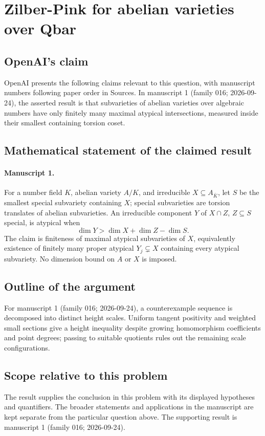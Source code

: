 \documentclass[11pt]{article}
\begin{document}
\section*{Zilber-Pink for abelian varieties over Qbar}

\subsection{OpenAI's claim}
OpenAI presents the following claims relevant to this question, with manuscript numbers following paper order in Sources. In manuscript 1 (family 016; 2026-09-24), the asserted result is that subvarieties of abelian varieties over algebraic numbers have only finitely many maximal atypical intersections, measured inside their smallest containing torsion coset.

\subsection{Mathematical statement of the claimed result}
\paragraph{Manuscript 1.}
For a number field $K$, abelian variety $A/K$, and irreducible $X\subseteq A_{\bar K}$, let $S$ be the smallest special subvariety containing $X$; special subvarieties are torsion translates of abelian subvarieties. An irreducible component $Y$ of $X\cap Z$, $Z\subseteq S$ special, is atypical when
\[
 \dim Y>\dim X+\dim Z-\dim S.
\]
The claim is finiteness of maximal atypical subvarieties of $X$, equivalently existence of finitely many proper atypical $Y_j\subsetneq X$ containing every atypical subvariety. No dimension bound on $A$ or $X$ is imposed.

\subsection{Outline of the argument}
For manuscript 1 (family 016; 2026-09-24), a counterexample sequence is decomposed into distinct height scales. Uniform tangent positivity and weighted small sections give a height inequality despite growing homomorphism coefficients and point degrees; passing to suitable quotients rules out the remaining scale configurations.

\subsection{Scope relative to this problem}
The result supplies the conclusion in this problem with its displayed hypotheses and quantifiers. The broader statements and applications in the manuscript are kept separate from the particular question above. The supporting result is manuscript 1 (family 016; 2026-09-24).
\end{document}

